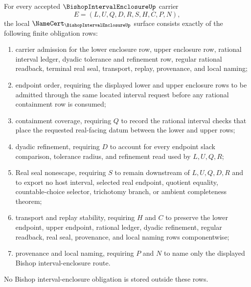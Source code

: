 \begin{theorem}
\label{thm:bishop-interval-enclosure-namecert-obligations}
For every accepted $\BishopIntervalEnclosureUp$ carrier
$$
E=(L,U,Q,D,R,S,H,C,P,N),
$$
the local $\NameCert_{\BishopIntervalEnclosureUp}$ surface consists exactly of the following finite obligation rows:
\begin{enumerate}
\item carrier admission for the lower enclosure row, upper enclosure row, rational interval ledger, dyadic tolerance and refinement row, regular rational readback, terminal real seal, transport, replay, provenance, and local naming;
\item endpoint order, requiring the displayed lower and upper enclosure rows to be admitted through the same located interval request before any rational containment row is consumed;
\item containment coverage, requiring $Q$ to record the rational interval checks that place the requested real-facing datum between the lower and upper rows;
\item dyadic refinement, requiring $D$ to account for every endpoint slack comparison, tolerance radius, and refinement read used by $L,U,Q,R$;
\item Real seal nonescape, requiring $S$ to remain downstream of $L,U,Q,D,R$ and to export no host interval, selected real endpoint, quotient equality, countable-choice selector, trichotomy branch, or ambient completeness theorem;
\item transport and replay stability, requiring $H$ and $C$ to preserve the lower endpoint, upper endpoint, rational ledger, dyadic refinement, regular readback, real seal, provenance, and local naming rows componentwise;
\item provenance and local naming, requiring $P$ and $N$ to name only the displayed Bishop interval-enclosure route.
\end{enumerate}
No Bishop interval-enclosure obligation is stored outside these rows.
\end{theorem}
